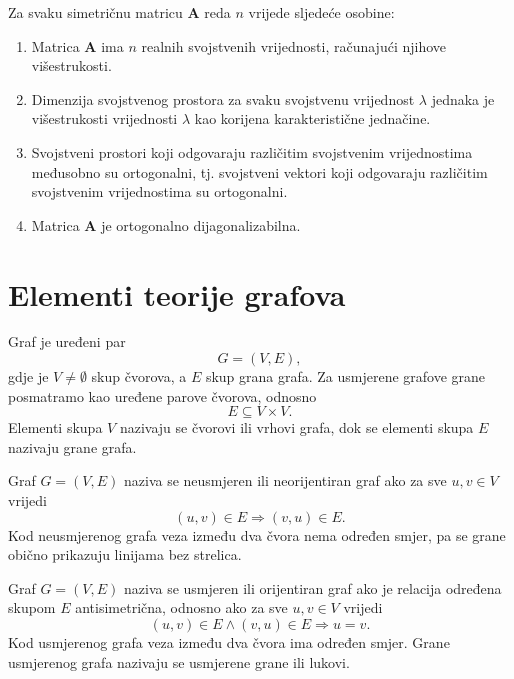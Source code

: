 \begin{theorem}\label{th:spektralni-teorem}
Za svaku simetričnu matricu \(\mathbf{A}\) reda \(n\) vrijede sljedeće osobine:
\begin{enumerate}
    \item Matrica \(\mathbf{A}\) ima \(n\) realnih svojstvenih vrijednosti, računajući njihove višestrukosti.
    
    \item Dimenzija svojstvenog prostora za svaku svojstvenu vrijednost \(\lambda\) jednaka je višestrukosti vrijednosti \(\lambda\) kao korijena karakteristične jednačine.
    
    \item Svojstveni prostori koji odgovaraju različitim svojstvenim vrijednostima međusobno su ortogonalni, tj. svojstveni vektori koji odgovaraju različitim svojstvenim vrijednostima su ortogonalni.
    
    \item Matrica \(\mathbf{A}\) je ortogonalno dijagonalizabilna. \cite{lay2016linear}
\end{enumerate}
\end{theorem}


 
\section{Elementi teorije grafova}

\begin{definition}
Graf je uređeni par
\begin{equation}
    G = (V, E),
\end{equation}
gdje je \(V \neq \emptyset\) skup čvorova, a \(E\) skup grana grafa. Za usmjerene grafove grane posmatramo kao uređene parove čvorova, odnosno
\begin{equation}
    E \subseteq V \times V.
\end{equation}
Elementi skupa \(V\) nazivaju se čvorovi ili vrhovi grafa, dok se elementi skupa \(E\) nazivaju grane grafa. \cite{juric2019elementi}
\end{definition}
\begin{definition}
Graf \(G=(V,E)\) naziva se neusmjeren ili neorijentiran graf ako za sve \(u,v \in V\) vrijedi
\begin{equation}
    (u,v) \in E \Rightarrow (v,u) \in E.
\end{equation}
Kod neusmjerenog grafa veza između dva čvora nema određen smjer, pa se grane obično prikazuju linijama bez strelica. \cite{juric2019elementi}
\end{definition}
\begin{definition}
Graf \(G=(V,E)\) naziva se usmjeren ili orijentiran graf ako je relacija određena skupom \(E\) antisimetrična, odnosno ako za sve \(u,v \in V\) vrijedi
\begin{equation}
    (u,v) \in E \land (v,u) \in E \Rightarrow u=v.
\end{equation}
Kod usmjerenog grafa veza između dva čvora ima određen smjer. Grane usmjerenog grafa nazivaju se usmjerene grane ili lukovi. \cite{juric2019elementi}
\end{definition}

